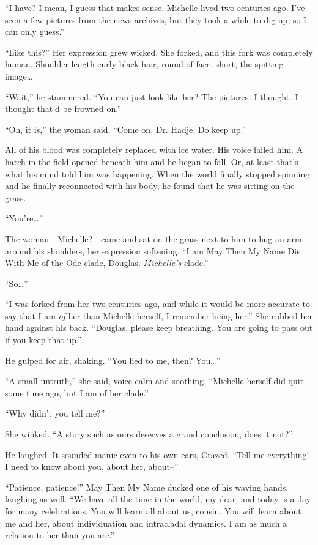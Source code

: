 ``I have? I mean, I guess that makes sense. Michelle lived two centuries ago. I've seen a few pictures from the news archives, but they took a while to dig up, so I can only guess.''

``Like this?'' Her expression grew wicked. She forked, and this fork was completely human. Shoulder-length curly black hair, round of face, short, the spitting image\ldots{}

``Wait,'' he stammered. ``You can just look like her? The pictures\ldots I thought\ldots I thought that'd be frowned on.''

``Oh, it is,'' the woman said. ``Come on, Dr. Hadje. Do keep up.''

All of his blood was completely replaced with ice water. His voice failed him. A hatch in the field opened beneath him and he began to fall. Or, at least that's what his mind told him was happening. When the world finally stopped spinning and he finally reconnected with his body, he found that he was sitting on the grass.

``You're\ldots{}''

The woman---Michelle?---came and sat on the grass next to him to hug an arm around his shoulders, her expression softening. ``I am May Then My Name Die With Me of the Ode clade, Douglas. \emph{Michelle's} clade.''

``So\ldots{}''

``I was forked from her two centuries ago, and while it would be more accurate to say that I am \emph{of} her than Michelle herself, I remember being her.'' She rubbed her hand against his back. ``Douglas, please keep breathing. You are going to pass out if you keep that up.''

He gulped for air, shaking. ``You lied to me, then? You\ldots{}''

``A small untruth,'' she said, voice calm and soothing. ``Michelle herself did quit some time ago, but I am of her clade.''

``Why didn't you tell me?''

She winked. ``A story such as ours deserves a grand conclusion, does it not?''

He laughed. It sounded manic even to his own ears, Crazed. ``Tell me everything! I need to know about you, about her, about--''

``Patience, patience!'' May Then My Name ducked one of his waving hands, laughing as well. ``We have all the time in the world, my dear, and today is a day for many celebrations. You will learn all about us, cousin. You will learn about me and her, about individuation and intracladal dynamics. I am as much a relation to her than you are.''

